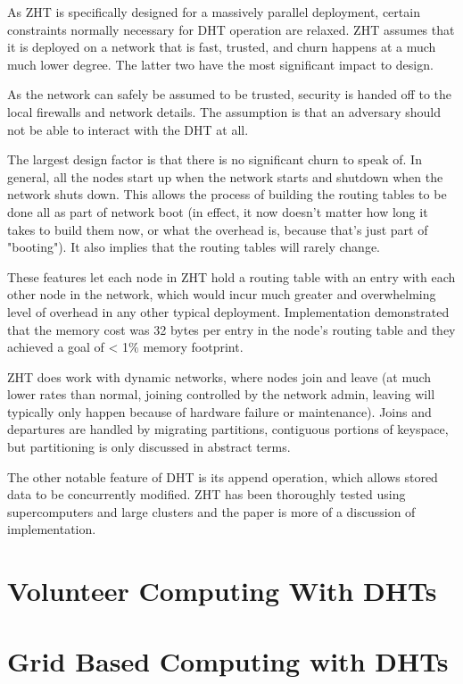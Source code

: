 \documentclass[10pt,letterpaper]{report}
\begin{document}
As ZHT is specifically designed for a massively parallel deployment, certain constraints normally necessary for DHT operation are relaxed.  ZHT assumes that it is deployed on a network that is fast, trusted, and churn happens at a much much lower degree.  The latter two have the most significant impact to design.

 As the network can safely be assumed to be trusted, security is handed off to the local firewalls and network details.   The assumption is that an adversary should not be able to interact with the DHT at all.  

The largest design factor is that there is no significant churn to speak of.  In general, all the nodes start up when the network starts and shutdown when the network shuts down.  This  allows the process of building the routing tables to be done all as part of network boot (in effect, it now doesn't matter how long it takes to build them now, or what the overhead is, because that's just part of "booting").  It also implies that the routing tables will rarely change.  

These features let each node in ZHT hold a routing table with an entry with each other node in the network, which would incur much greater and overwhelming level of overhead in any  other typical deployment.  Implementation demonstrated that the memory cost was 32 bytes per entry in the node's routing table and they achieved a goal of < 1$\%$ memory footprint.

ZHT does work with dynamic networks, where nodes join and leave (at much lower rates than normal,  joining controlled by the network admin, leaving will typically only happen because of hardware failure or maintenance).  Joins and departures  are handled by migrating partitions, contiguous portions of keyspace, but partitioning is only discussed in abstract terms.

The other notable feature of DHT is its append operation, which allows stored data  to be concurrently modified.  ZHT has been thoroughly tested using  supercomputers and large clusters and the paper is more of a discussion of implementation. 


\section{Volunteer Computing With DHTs}
\section{Grid Based Computing with DHTs}




\end{document}
